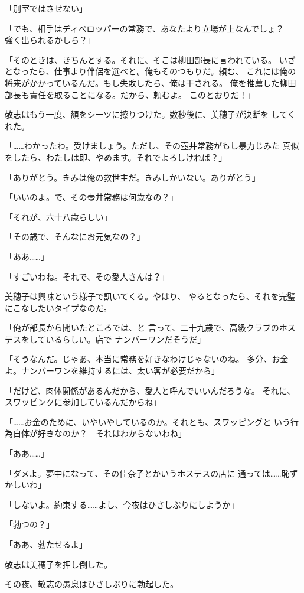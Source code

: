 ﻿\documentclass[
    book,tate,
    line_length=30zw,
    jafontsize=12pt,
    paper=b5j,
    landscape,
    ]{jlreq}
\begin{document}
「別室ではさせない」

「でも、相手はディベロッパーの常務で、あなたより立場が上なんでしょ？　
強く出られるかしら？」

「そのときは、きちんとする。それに、そこは柳田部長に言われている。
いざとなったら、仕事より伴侶を選べと。俺もそのつもりだ。頼む、
これには俺の将来がかかっているんだ。もし失敗したら、俺は干される。
俺を推薦した柳田部長も責任を取ることになる。だから、頼むよ。
このとおりだ！」

敬志はもう一度、額をシーツに擦りつけた。数秒後に、美穂子が決断を
してくれた。

「……わかったわ。受けましょう。ただし、その壺井常務がもし暴力じみた
真似をしたら、わたしは即、やめます。それでよろしければ？」

「ありがとう。きみは俺の救世主だ。きみしかいない。ありがとう」

「いいのよ。で、その壺井常務は何歳なの？」

「それが、六十八歳らしい」

「その歳で、そんなにお元気なの？」

「ああ……」

「すごいわね。それで、その愛人さんは？」

美穂子は興味という様子で訊いてくる。やはり、
やるとなったら、それを完璧にこなしたいタイプなのだ。

「俺が部長から聞いたところでは、と
言って、二十九歳で、高級クラブのホステスをしているらしい。店で
ナンバーワンだそうだ」

「そうなんだ。じゃあ、本当に常務を好きなわけじゃないのね。
多分、お金よ。ナンバーワンを維持するには、太い客が必要だから」

「だけど、肉体関係があるんだから、愛人と呼んでいいんだろうな。
それに、スワッピンクに参加しているんだからね」

「……お金のために、いやいやしているのか。それとも、スワッピングと
いう行為自体が好きなのか？　それはわからないわね」

「ああ……」

「ダメよ。夢中になって、その佳奈子とかいうホステスの店に
通っては……恥ずかしいわ」

「しないよ。約束する……よし、今夜はひさしぶりにしようか」

「勃つの？」

「ああ、勃たせるよ」

敬志は美穂子を押し倒した。

その夜、敬志の愚息はひさしぶりに勃起した。
\end{document}
